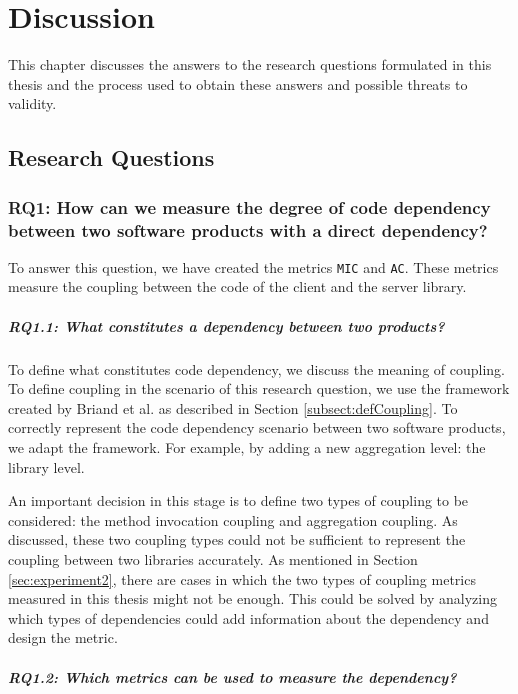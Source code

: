 \chapter{Discussion}\label{ch:Discussion}
This chapter discusses the answers to the research questions formulated in this thesis and the process used to obtain these answers and possible threats to validity.

\section{Research Questions}

\subsection{RQ1: How can we measure the degree of code dependency between two software products with a direct dependency?}

To answer this question, we have created the metrics \texttt{MIC} and \texttt{AC}. These metrics measure the coupling between the code of the client and the server library.

\paragraph{RQ1.1: What constitutes a dependency between two products?}

To define what constitutes code dependency, we discuss the meaning of coupling. To define coupling in the scenario of this research question, we use the framework created by Briand et al. \cite{briand1999unified} as described in Section \ref{subsect:defCoupling}. To correctly represent the code dependency scenario between two software products, we adapt the framework. For example, by adding a new aggregation level: the library level.

An important decision in this stage is to define two types of coupling to be considered: the method invocation coupling and aggregation coupling. As discussed, these two coupling types could not be sufficient to represent the coupling between two libraries accurately. As mentioned in Section \ref{sec:experiment2}, there are cases in which the two types of coupling metrics measured in this thesis might not be enough. This could be solved by analyzing which types of dependencies could add information about the dependency and design the metric.

\paragraph{RQ1.2: Which metrics can be used to measure the dependency?}

